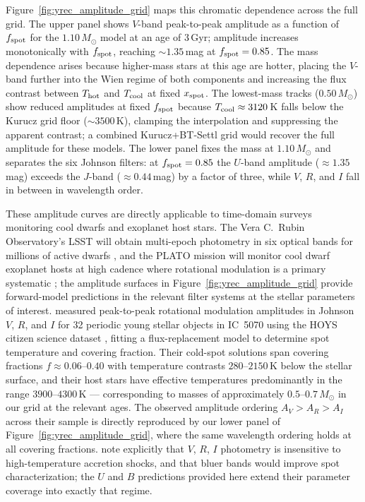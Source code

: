 \documentclass[linenumbers,apj,twocolumn, floatfix]{aastex701} \usepackage{amsmath} \usepackage{longtable} \usepackage{graphicx} \usepackage{ulem} \usepackage{xcolor} \usepackage{lettrine} \usepackage{yfonts} \usepackage{rotating}
\begin{document}
Figure~\ref{fig:yrec_amplitude_grid} maps this chromatic dependence across the full grid.
The upper panel shows $V$-band peak-to-peak amplitude as a function of $f_{\rm spot}$ for the $1.10\,M_\odot$ model at an age of 3\,Gyr; amplitude increases monotonically with $f_{\rm spot}$, reaching $\sim 1.35$\,mag at $f_{\rm spot} = 0.85$.
The mass dependence arises because higher-mass stars at this age are hotter, placing the $V$-band further into the Wien regime of both components and increasing the flux contrast between $T_{\rm hot}$ and $T_{\rm cool}$ at fixed $x_{\rm spot}$.
The lowest-mass tracks ($0.50\,M_\odot$) show reduced amplitudes at fixed $f_{\rm spot}$ because $T_{\rm cool} \approx 3120$\,K falls below the Kurucz grid floor ($\sim 3500$\,K), clamping the interpolation and suppressing the apparent contrast; a combined Kurucz+BT-Settl grid would recover the full amplitude for these models.
The lower panel fixes the mass at $1.10\,M_\odot$ and separates the six Johnson filters: at $f_{\rm spot} = 0.85$ the $U$-band amplitude ($\approx 1.35$\,mag) exceeds the $J$-band ($\approx 0.44$\,mag) by a factor of three, while $V$, $R$, and $I$ fall in between in wavelength order.

These amplitude curves are directly applicable to time-domain surveys monitoring cool dwarfs and exoplanet host stars.
The Vera C.\ Rubin Observatory's LSST will obtain multi-epoch photometry in six optical bands for millions of active dwarfs \citep{LSST}, and the PLATO mission will monitor cool dwarf exoplanet hosts at high cadence where rotational modulation is a primary systematic \citep{plato}; the amplitude surfaces in Figure~\ref{fig:yrec_amplitude_grid} provide forward-model predictions in the relevant filter systems at the stellar parameters of interest. \citet{Herbert2024} measured peak-to-peak rotational modulation amplitudes in Johnson $V$, $R$, and $I$ for 32 periodic young stellar objects in IC~5070 using the HOYS citizen science dataset \citep{Froebrich2018}, fitting a flux-replacement model to determine spot temperature and covering fraction.
Their cold-spot solutions span covering fractions $f \approx 0.06$--$0.40$ with temperature contrasts $280$--$2150$\,K below the stellar surface, and their host stars have effective temperatures predominantly in the range $3900$--$4300$\,K --- corresponding to masses of approximately $0.5$--$0.7\,M_\odot$ in our grid at the relevant ages.
The observed amplitude ordering $A_V > A_R > A_I$ across their sample is directly reproduced by our lower panel of Figure~\ref{fig:yrec_amplitude_grid}, where the same wavelength ordering holds at all covering fractions. \citet{Herbert2024} note explicitly that $V$, $R$, $I$ photometry is insensitive to high-temperature accretion shocks, and that bluer bands would improve spot characterization; the $U$ and $B$ predictions provided here extend their parameter coverage into exactly that regime.
\end{document}
